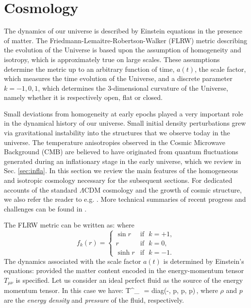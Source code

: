 \section{Cosmology}
\label{SecCO}

The dynamics of our universe is described by Einstein equations in the presence of matter. The Friedmann-Lemaitre-Robertson-Walker (FLRW) metric describing the evolution of the Universe  is based upon the assumption of homogeneity and isotropy, which is approximately true on large scales. These assumptions  determine the metric up to an arbitrary function of time, $a(t)$, the scale factor, which measures the time evolution of the Universe, and a discrete parameter $k = -1,0,1$, which determines the 3-dimensional curvature of the Universe, namely whether it is respectively open, flat or closed.

Small deviations from homogeneity at early epochs played a very important role in the dynamical history of our universe. Small initial density perturbations grew via gravitational instability into the structures that we observe today in the universe. The temperature anisotropies observed in the Cosmic Microwave Background (CMB) are believed to have originated from quantum fluctuations generated during an inflationary stage in the early universe, which we review in Sec. \ref{sec:infla}. In this section we review the main features of the homogeneous and isotropic cosmology necessary for the subsequent sections. For dedicated accounts of the standard $\Lambda$CDM cosmology and the growth of cosmic structure, we also refer the reader to e.g. \cite{Dodelson:2003ft, Weinberg:2008zzc, Mukhanov:2005sc, Baumann:2022mni}. More technical summaries of recent progress and challenges can be found in  \cite{Chou:2022luk, Green:2022hhj, Flauger:2022hie}.
\bigskip

The FLRW metric can be written as:
\be\label{eq:FLRW}
\setlength\fboxsep{0.25cm}
\setlength\fboxrule{0.4pt}
\ee
where
\begin{equation*}
f_k(r) =  \left\{
\begin{array}{rl}
\sin r  & \text{if }\,\, k = +1 ,\\
r & \text{if }\,\, k = 0,\\
\sinh r & \text{if } \,\, k =-1.
\end{array} \right.
\end{equation*}
The dynamics associated with the scale factor $a(t)$ is determined by Einstein's equations:
\be\label{eq:Einstein4D}
\setlength\fboxsep{0.25cm}
\setlength\fboxrule{0.4pt}
\ee
 provided the matter content encoded in the energy-momentum tensor $T_{\mu\nu}$  is specified. Let us consider an ideal perfect fluid as the source of
the energy momentum tensor. In this case we have:
\be\label{eq:EMT4D}
 T^\mu_{\,\,\nu} = {\rm diag}\left(-\rho, p, p, p\right)\,,
 \ee
 where  $\rho$ and  $p$ are the {\em energy density} and {\em pressure} of the fluid, respectively.


